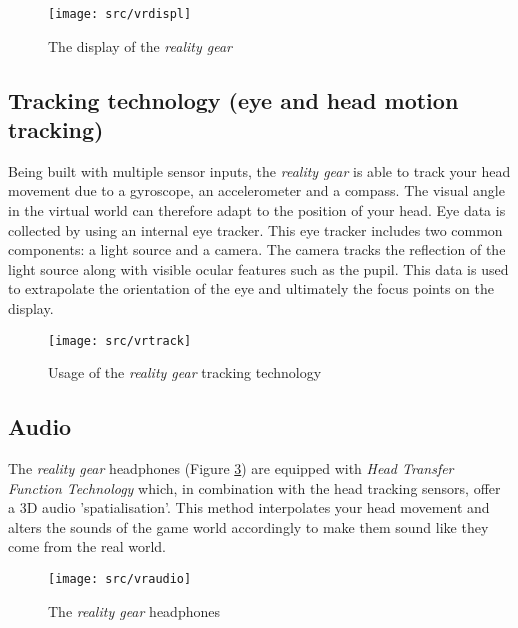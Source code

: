 \begin{figure}[!ht]
\begin{center}
\texttt{[image: src/vrdispl]}
\end{center}
\caption[The display of the \emph{\pokeT{} reality gear}]{The display of the \emph{\poke{} reality gear}}
\label{vrdisplay}
\end{figure}

\subsection{Tracking technology (eye and head motion tracking)}
Being built with multiple sensor inputs, the \emph{\poke{} reality gear} is able to track your head movement due to a gyroscope, an accelerometer and a compass. The visual angle in the virtual world can therefore adapt to the position of your head. Eye data is collected by using an internal eye tracker. This eye tracker includes two common components: a light source and a camera. The camera tracks the reflection of the light source along with visible ocular features such as the pupil. This data is used to extrapolate the orientation of the eye and ultimately the focus points on the display.
\begin{figure}[!ht]
\begin{center}
\texttt{[image: src/vrtrack]}
\end{center}
\caption[Usage of the \emph{\pokeT{} reality gear} tracking technology]{Usage of the \emph{\poke{} reality gear} tracking technology}
\label{vrtrack}
\end{figure}

\subsection{Audio}
The \emph{\poke{} reality gear} headphones (Figure \ref{vraudio}) are equipped with \emph{Head Transfer Function Technology} which, in combination with the head tracking sensors, offer a 3D audio 'spatialisation'. This method interpolates your head movement and alters the sounds of the game world accordingly to make them sound like they come from the real world.

\begin{figure}[!ht]
\begin{center}
\texttt{[image: src/vraudio]}
\end{center}
\caption[The \emph{\pokeT{} reality gear} headphones]{The \emph{\poke{} reality gear} headphones}
\label{vraudio}
\end{figure}


